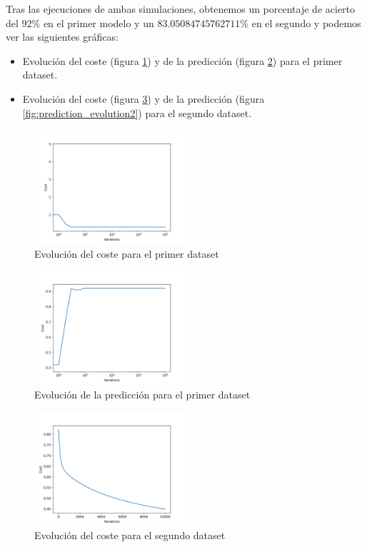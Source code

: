 \documentclass[6pt]{AiTex}
\begin{document}
Tras las ejecuciones de ambas simulaciones, obtenemos un porcentaje de acierto del $92\%$ en el primer modelo y un $83.05084745762711\%$ en el segundo y podemos ver las siguientes gráficas:
\begin{itemize}
    \item Evolución del coste (figura \ref{fig:cost_evolution1}) y de la predicción (figura \ref{fig:prediction_evolution1}) para el primer dataset.
    \item Evolución del coste (figura \ref{fig:cost_evolution2}) y de la predicción (figura \ref{fig:prediction_evolution2}) para el segundo dataset.
\end{itemize}

\begin{figure}[H]
    \centering
    \includegraphics[width=0.5\textwidth]{./imagenes/muestreo1_cost.png}
    \caption{Evolución del coste para el primer dataset}
    \label{fig:cost_evolution1}
\end{figure}

\begin{figure}[H]
    \centering
    \includegraphics[width=0.5\textwidth]{./imagenes/muestreo1_accuracy.png}
    \caption{Evolución de la predicción para el primer dataset}
    \label{fig:prediction_evolution1}
\end{figure}

\begin{figure}[H]
    \centering
    \includegraphics[width=0.5\textwidth]{./imagenes/muestreo2_cost.png}
    \caption{Evolución del coste para el segundo dataset}
    \label{fig:cost_evolution2}
\end{figure}
\end{document}
